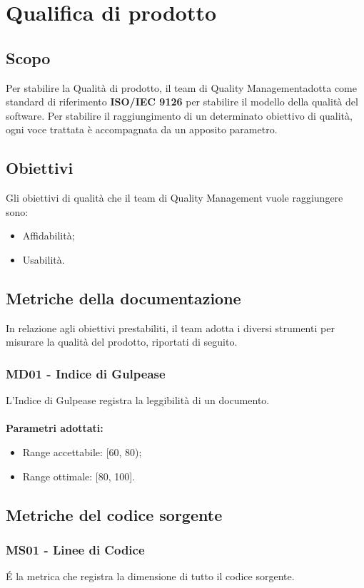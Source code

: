 \section{Qualifica di prodotto}
\subsection{Scopo}
Per stabilire la Qualità di prodotto, il team di Quality Management\glo adotta come standard di riferimento \textbf{ISO/IEC 9126} per stabilire il modello della qualità del software. Per stabilire il raggiungimento di un determinato obiettivo di qualità, ogni voce trattata è accompagnata da un apposito parametro.
\subsection{Obiettivi}
Gli obiettivi di qualità che il team di Quality Management vuole raggiungere sono:
\begin{itemize}
\item Affidabilità;
\item Usabilità.
\end{itemize}
\subsection{Metriche della documentazione}
In relazione agli obiettivi prestabiliti, il team adotta i diversi strumenti per misurare la qualità del prodotto, riportati di seguito.
\subsubsection{MD01 - Indice di Gulpease}
L'Indice di Gulpease registra la leggibilità di un documento. \\ \\ 
\textbf{Parametri adottati:} 
\begin{itemize}
\item Range accettabile: [60, 80);
\item Range ottimale: [80, 100].
\end{itemize}
\subsection{Metriche del codice sorgente}
\subsubsection{MS01 - Linee di Codice}
\'E la metrica che registra la dimensione di tutto il codice sorgente.
